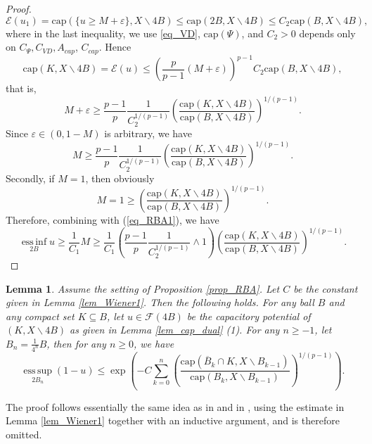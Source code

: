 \documentclass[11pt,a4paper]{article}
\numberwithin{equation}{section}
\newcommand{\esup}{\operatorname*{ess\,sup}}
\newcommand{\einf}{\operatorname*{ess\,inf}}
\theoremstyle{plain}
\newtheorem{lemma}[theorem]{Lemma}
\theoremstyle{definition}
\begin{document}
\begin{proof}
$$\mathcal{E}(u_1)=\mathrm{cap}\left({\{u\ge M+\varepsilon\}},X\backslash 4B\right)\le \mathrm{cap}\left(2B,X\backslash 4B\right)\le C_2 \mathrm{cap}\left(B,X\backslash 4B\right),$$
where in the last inequality, we use \ref{eq_VD}, \hyperlink{eq_cap}{$\text{cap}(\Psi)$}, and $C_2>0$ depends only on $C_\Psi, C_{VD}, A_{cap}$, $C_{cap}$. Hence
$$\mathrm{cap}\left(K,X\backslash 4B\right)=\mathcal{E}(u)\le \left(\frac{p}{p-1}(M+\varepsilon)\right)^{p-1} C_2 \mathrm{cap}\left(B,X\backslash 4B\right),$$
that is,
$$M+\varepsilon\ge \frac{p-1}{p}\frac{1}{C_2^{1/(p-1)}}\left(\frac{\mathrm{cap}\left(K,X\backslash 4B\right)}{\mathrm{cap}\left(B,X\backslash 4B\right)}\right)^{1/(p-1)}.$$
Since $\varepsilon\in(0,1-M)$ is arbitrary, we have
$$M\ge \frac{p-1}{p}\frac{1}{C_2^{1/(p-1)}}\left(\frac{\mathrm{cap}\left(K,X\backslash 4B\right)}{\mathrm{cap}\left(B,X\backslash 4B\right)}\right)^{1/(p-1)}.$$
Secondly, if $M=1$, then obviously
$$M=1\ge \left(\frac{\mathrm{cap}\left(K,X\backslash 4B\right)}{\mathrm{cap}\left(B,X\backslash 4B\right)}\right)^{1/(p-1)}.$$
Therefore, combining with (\ref{eq_RBA1}), we have
$$\einf_{2B}u\ge \frac{1}{C_1}M\ge \frac{1}{C_1}\left(\frac{p-1}{p}\frac{1}{C_2^{1/(p-1)}}\wedge 1\right)\left(\frac{\mathrm{cap}\left(K,X\backslash 4B\right)}{\mathrm{cap}\left(B,X\backslash 4B\right)}\right)^{1/(p-1)}.$$
\end{proof}

\begin{lemma}\label{lem_Wiener2}
Assume the setting of Proposition \ref{prop_RBA}. Let $C$ be the constant given in Lemma \ref{lem_Wiener1}. Then the following holds. For any ball $B$ and any compact set $K\subseteq B$, let $u\in \mathcal{F}(4B)$ be the capacitory potential of $(K,X\backslash 4B)$ as given in Lemma \ref{lem_cap_dual} (1). For any $n\ge-1$, let $B_n=\frac{1}{4^n}B$, then for any $n\ge0$, we have
$$\esup_{2B_n}\left(1-u\right)\le \exp \left(-C\sum_{k=0}^n \left(\frac{\mathrm{cap}\left(\overline{B}_k\cap K,X\backslash B_{k-1}\right)}{\mathrm{cap}(B_k,X\backslash B_{k-1})}\right)^{1/(p-1)}\right).$$
\end{lemma}

The proof follows essentially the same idea as in \cite[Theorem 11.21]{BB11} and in \cite[Lemma 6.25]{HKM06}, using the estimate in Lemma \ref{lem_Wiener1} together with an inductive argument, and is therefore omitted.
\end{document}
